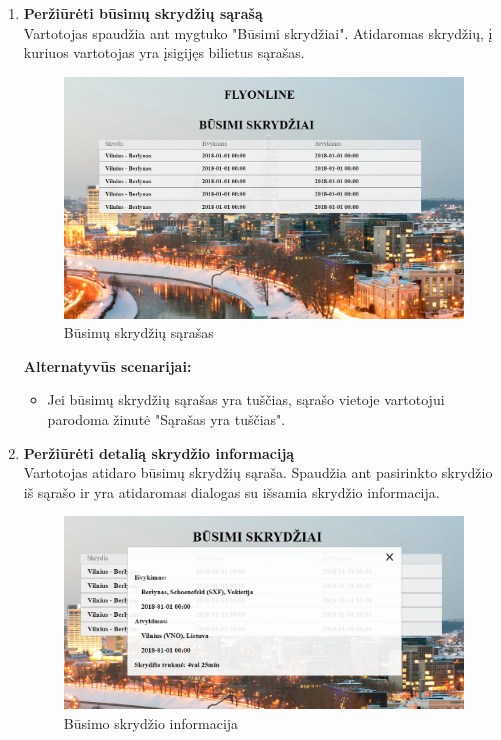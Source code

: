 \documentclass{VUMIFPSkursinis}
\begin{document}
\begin{enumerate}[label=\textbf{U\arabic*}.]
                    \item \textbf{Peržiūrėti būsimų skrydžių sąrašą}\\
                    Vartotojas spaudžia ant mygtuko "Būsimi skrydžiai". Atidaromas skrydžių, į kuriuos vartotojas yra įsigijęs bilietus sąrašas.
                    \begin{figure}[H]	
                        \centering
                        \includegraphics[scale=0.6]{img/history}	
                        \caption{Būsimų skrydžių sąrašas}	
                        \label{Būsimų skrydžių sąrašas}	
                    \end{figure}
                    \textbf{Alternatyvūs scenarijai:}
                    \begin{itemize}
                        \item Jei būsimų skrydžių sąrašas yra tuščias, sąrašo vietoje vartotojui parodoma žinutė "Sąrašas yra tuščias".
                    \end{itemize}

                    \item \textbf{Peržiūrėti detalią skrydžio informaciją}\\
                    Vartotojas atidaro būsimų skrydžių sąraša. Spaudžia ant pasirinkto skrydžio iš sąrašo ir yra atidaromas dialogas su išsamia skrydžio informacija.
                    \begin{figure}[H]	
                        \centering
                        \includegraphics[scale=0.6]{img/details}	
                        \caption{Būsimo skrydžio informacija}	
                        \label{figure:Būsimo skrydžio informacija}	
                    \end{figure}
                    

\end{enumerate}
\end{document}

